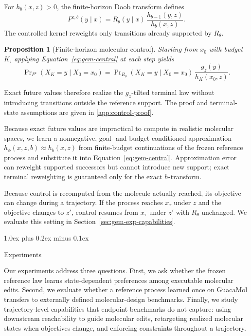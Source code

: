 \documentclass{article}
\makeatletter
\newtheorem{proposition}[theorem]{Proposition}
\theoremstyle{definition}
\theoremstyle{remark}
\def\section{\@startsection{section}{1}{\z@}{-1.4ex plus -0.4ex minus -.2ex}%
  {1.0ex plus 0.2ex minus 0.1ex}{\large\sc\raggedright}}
\makeatother
\begin{document}
For $h_b(x,z)>0$, the finite-horizon Doob transform defines
\begin{equation}
  P^{z,b}(y\mid x)
  =
  R_\theta(y\mid x)\,
  \frac{h_{b-1}(y,z)}{h_b(x,z)} .
  \label{eq:gem-central}
\end{equation}
The controlled kernel reweights only transitions already supported by
$R_\theta$.

\begin{proposition}[Finite-horizon molecular control]
\label{prop:gem-doob}
Starting from $x_0$ with budget $K$, applying
Equation~\eqref{eq:gem-central} at each step yields
\[
  \Pr\nolimits_{P^z}(X_K=y\mid X_0=x_0)
  =
  \Pr\nolimits_{R_\theta}(X_K=y\mid X_0=x_0)\,
  \frac{g_z(y)}{h_K(x_0,z)} .
\]
\end{proposition}

Exact future values therefore realize the $g_z$-tilted terminal law without
introducing transitions outside the reference support. The proof and
terminal-state assumptions are given in \cref{app:control-proof}.

Because exact future values are impractical to compute in realistic molecular
spaces, we learn a nonnegative, goal- and budget-conditioned approximation
$h_\phi(x,z,b)\approx h_b(x,z)$ from finite-budget continuations of the frozen
reference process and substitute it into Equation~\eqref{eq:gem-central}.
Approximation error can reweight supported successors but cannot introduce new
support; exact terminal reweighting is guaranteed only for the exact
$h$-transform.

Because control is recomputed from the molecule actually reached, its objective
can change during a trajectory. If the process reaches $x_\tau$ under $z$ and the
objective changes to $z'$, control resumes from $x_\tau$ under $z'$ with
$R_\theta$ unchanged. We evaluate this setting in
Section~\ref{sec:gem-exp-capabilities}.

\section{Experiments}
\label{sec:gem-experiments}

Our experiments address three questions. First, we ask whether the frozen reference
law learns state-dependent preferences among executable molecular edits. Second,
we evaluate whether a reference process learned once on GuacaMol transfers 
to externally defined molecular-design benchmarks. Finally, we study
trajectory-level capabilities that endpoint benchmarks do not capture: using
downstream reachability to guide molecular edits, retargeting realized molecular
states when objectives change, and enforcing constraints throughout a
trajectory.
\end{document}

